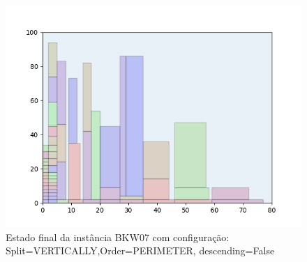 \begin{figure}[H]
    \centering
    \caption[]{Estado final da instância BKW07 com configuração: Split=VERTICALLY,Order=PERIMETER, descending=False}
    \label{fig:bkw07-vertically-perimeter-false}
    \includegraphics[scale=0.5]{output/figures/bkw/bkw07/vertically/perimeter/false/00}
\end{figure}